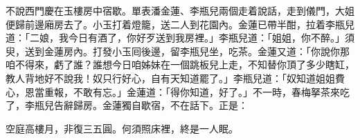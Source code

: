 不說西門慶在玉樓房中宿歇。單表潘金蓮、李瓶兒兩個走着說話，走到儀門，大姐便歸前邊廂房去了。小玉打着燈籠，送二人到花園內。金蓮已帶半酣，拉着李瓶兒道：「二娘，我今日有酒了，你好歹送到我房裡。」李瓶兒道：「姐姐，你不醉。」須臾，送到金蓮房內。打發小玉囘後邊，留李瓶兒坐，吃茶。金蓮又道：「你說你那咱不得來，虧了誰？誰想今日咱姊妹在一個跳板兒上走，不知替你頂了多少瞎缸，教人背地好不說我！奴只行好心，自有天知道罷了。」{}李瓶兒道：「奴知道姐姐費心，恩當重報，不敢有忘。」金蓮道：「得你知道，好了。」不一時，春梅拏茶來吃了，李瓶兒告辭歸房。金蓮獨自歇宿，不在話下。正是：

空庭高樓月，非復三五圓。何須照床裡，終是一人眠。

